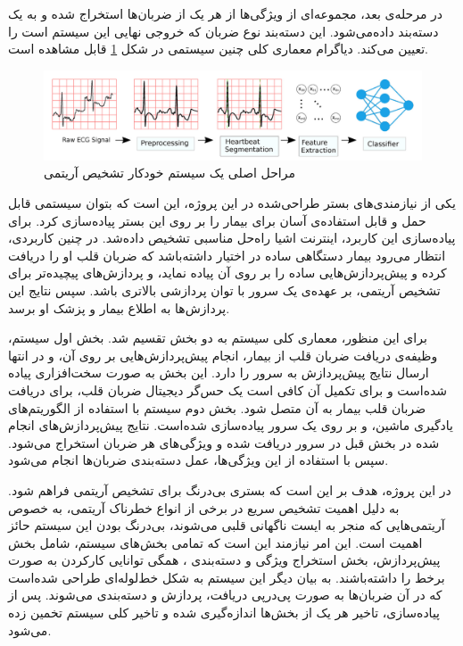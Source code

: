  در مرحله‌ی بعد، مجموعه‌ای از ویژگی‌ها از هر یک از ضربان‌ها استخراج شده و به یک دسته‌بند  داده‌می‌شود. این دسته‌بند نوع ضربان که خروجی نهایی این سیستم است را تعیین می‌کند. دیاگرام معماری کلی چنین سیستمی در شکل \ref{fig:classifierPicture} قابل مشاهده است. 
 
\begin{figure}[!htb]
\centering
\includegraphics[width=15cm]{Figures/classifier.png}
\caption{مراحل اصلی یک سیستم خودکار تشخیص آریتمی\cite{Mondejar}}
\label{fig:classifierPicture}
\end{figure}

یکی از نیازمندی‌های بستر طراحی‌شده در این پروژه، این است که بتوان سیستمی قابل حمل و قابل استفاده‌ی آسان برای بیمار را بر روی این بستر پیاده‌سازی کرد. برای پیاده‌سازی این کاربرد، اینترنت اشیا راه‌حل مناسبی تشخیص داده‌شد. در چنین کاربردی، انتظار می‌رود بیمار دستگاهی ساده در اختیار داشته‌باشد که ضربان قلب او را دریافت کرده و پیش‌پردازش‌هایی ساده را بر روی آن پیاده نماید، و پردازش‌های پیچیده‌تر برای تشخیص آریتمی، بر عهده‌ی یک سرور با توان پردازشی بالاتری باشد. سپس نتایج این پردازش‌ها به اطلاع بیمار و پزشک او برسد.

 برای این منظور، معماری کلی سیستم به دو بخش تقسیم شد. بخش اول سیستم، وظیفه‌ی دریافت ضربان قلب از بیمار،‌ انجام پیش‌پردازش‌هایی  بر روی آن، و در انتها ارسال نتایج پیش‌پردازش به سرور را دارد. این بخش به صورت سخت‌افزاری پیاده شده‌است و برای تکمیل آن کافی است یک حس‌گر  دیجیتال ضربان قلب، برای دریافت ضربان قلب بیمار به آن متصل شود. 
بخش دوم سیستم با استفاده از الگوریتم‌های یادگیری ماشین، و بر روی یک سرور پیاده‌سازی شده‌است. نتایج پیش‌پردازش‌های انجام شده در بخش قبل در سرور دریافت شده و ویژگی‌های هر ضربان استخراج می‌شود. سپس با استفاده از این ویژگی‌ها، عمل دسته‌بندی ضربان‌ها انجام می‌شود.

در این پروژه، هدف بر این است که بستری بی‌درنگ برای تشخیص آریتمی فراهم شود. به دلیل اهمیت تشخیص سریع در برخی از انواع خطرناک آریتمی، به خصوص آریتمی‌هایی که منجر به ایست ناگهانی قلبی می‌شوند، بی‌درنگ بودن این سیستم حائز اهمیت است. این امر نیازمند این است که تمامی بخش‌های سیستم، شامل بخش پیش‌پردازش،‌ بخش استخراج ویژگی  و دسته‌بندی ، همگی توانایی کارکردن به صورت برخط  را داشته‌باشند. به بیان دیگر این سیستم به شکل خط‌لوله‌ای  طراحی شده‌است که در آن ضربان‌ها به صورت پی‌در‌پی دریافت، پردازش‌ و دسته‌بندی می‌شوند. پس از پیاده‌سازی، تاخیر هر یک از بخش‌ها اندازه‌گیری شده و تاخیر کلی سیستم تخمین زده می‌شود. 

